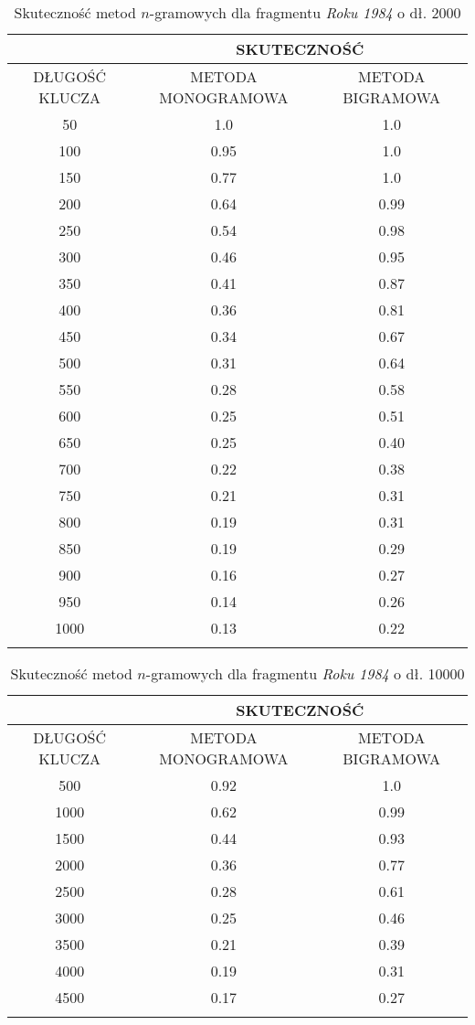 \documentclass[a4paper]{article}
\theoremstyle{defn}
\theoremstyle{theorem}
\theoremstyle{lemma}
\theoremstyle{cor}
\theoremstyle{fact}
\begin{document}
\begin{center}\begin{longtable}{
|c|c|c|}
\hline &\multicolumn{2}{|c|}{SKUTECZNOŚĆ} \\
\hline DŁUGOŚĆ KLUCZA & METODA MONOGRAMOWA & METODA BIGRAMOWA\\ \hline
50
 & 1.0 & 1.0\\ \hline
100
 & 0.95 & 1.0\\ \hline
150
 & 0.77 & 1.0\\ \hline
200
 & 0.64 & 0.99\\ \hline
250
 & 0.54 & 0.98\\ \hline
300
 & 0.46 & 0.95\\ \hline
350
 & 0.41 & 0.87\\ \hline
400
 & 0.36 & 0.81\\ \hline
450
 & 0.34 & 0.67\\ \hline
500
 & 0.31 & 0.64\\ \hline
550
 & 0.28 & 0.58\\ \hline
600
 & 0.25 & 0.51\\ \hline
650
 & 0.25 & 0.40\\ \hline
700
 & 0.22 & 0.38\\ \hline
750
 & 0.21 & 0.31\\ \hline
800
 & 0.19 & 0.31\\ \hline
850
 & 0.19 & 0.29\\ \hline
900
 & 0.16 & 0.27\\ \hline
950
 & 0.14 & 0.26\\ \hline
1000
 & 0.13 & 0.22\\ \hline
   \caption{Skuteczność metod $n$-gramowych dla fragmentu \textit{Roku 1984} o dł. 2000}
\end{longtable}\end{center}

\begin{center}\begin{longtable}{
|c|c|c|}
\hline &\multicolumn{2}{|c|}{SKUTECZNOŚĆ} \\
\hline DŁUGOŚĆ KLUCZA & METODA MONOGRAMOWA & METODA BIGRAMOWA\\ \hline
500
 & 0.92 & 1.0\\ \hline
1000
 & 0.62 & 0.99\\ \hline
1500
 & 0.44 & 0.93\\ \hline
2000
 & 0.36 & 0.77\\ \hline
2500
 & 0.28 & 0.61\\ \hline
3000
 & 0.25 & 0.46\\ \hline
3500
 & 0.21 & 0.39\\ \hline
4000
 & 0.19 & 0.31\\ \hline
4500
 & 0.17 & 0.27\\ \hline
    \caption{Skuteczność metod $n$-gramowych dla fragmentu \textit{Roku 1984} o dł. 10000}
\end{longtable}\end{center}
\end{document}
